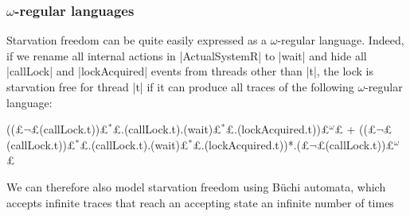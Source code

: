 \subsubsection{$\omega$-regular languages}


Starvation freedom can be quite easily expressed as a $\omega$-regular language. Indeed, if we rename all internal actions in |ActualSystemR| to |wait| and hide all |callLock| and |lockAcquired| events from threads other than |t|, the lock is starvation free for thread |t| if it can produce all traces of the following $\omega$-regular language:
\begin{cspm}
  ((£$\neg$£(callLock.t))£$^{*}$£.(callLock.t).(wait)£$^{*}$£.(lockAcquired.t))£$^{\omega}$£ + 
  ((£$\neg$£(callLock.t))£$^{*}$£.(callLock.t).(wait)£$^{*}$£.(lockAcquired.t))*.(£$\neg$£(callLock.t))£$^{\omega}$£
\end{cspm}

We can therefore also model starvation freedom using B{\"u}chi automata, which accepts infinite traces that reach an accepting state an infinite number of times



